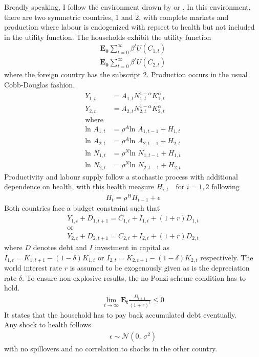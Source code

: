 \documentclass{article}
\begin{document}
Broadly speaking, I follow the environment drawn by \cite{backus1992international} or \cite{kim2003spurious}. In this environment, there are two symmetric countries, 1 and 2, with complete markets and production where labour is endogenized with repsect to health but not included in the utility function. The households exhibit the utility function
\begin{align}
\mathbf{E_0} \sum_{t=0}^{\infty} \beta^{t} U(C_{1, t}) \\
\mathbf{E_0} \sum_{t=0}^{\infty} \beta^{t} U(C_{2, t})
\end{align} 
where the foreign country has the subscript 2. Production occurs in the usual Cobb-Douglas fashion.
\begin{align}
Y_{1, t} &= A_{1, t} N_{1, t}^{1-\alpha} K_{1, t}^{\alpha} \\
Y_{2, t} &= A_{2, t} N_{2, t}^{1-\alpha} K_{2, t}^{\alpha} \\
\text{where} \nonumber \\
\text{ln } A_{1, t} &= \rho^A \text{ln } A_{1, t-1} + H_{1, t} \\
\text{ln } A_{2, t} &= \rho^A \text{ln } A_{2, t-1} + H_{2, t} \\
\text{ln } N_{1, t} &= \rho^N \text{ln } N_{1, t-1} + H_{1, t} \\
\text{ln } N_{2, t} &= \rho^N \text{ln } N_{2, t-1} + H_{2, t}
\end{align}
Productivity and labour supply follow a stochastic process with additional dependence on health, with this health measure $H_{i, t} \text{  } \text{ for }  i= 1,2$ following 
\begin{align}
H_t = \rho^H H_{t-1} + \epsilon
\end{align}
Both countries face a budget constraint such that 
\begin{align}
Y_{1, t} + D_{1, t+1} = C_{1, t} + I_{1, t} + (1+r)D_{1, t} \\
\text{or} \nonumber \\
Y_{2, t} + D_{2, t+1} = C_{2, t} + I_{2, t} + (1+r)D_{2, t}
\end{align}
where $D$ denotes debt and $I$ investment in capital as $I_{1, t} = K_{1, t+1} - (1 - \delta)K_{1, t}$ or $I_{2, t} = K_{2, t+1} - (1 - \delta)K_{2, t}$ respectively. The world interest rate $r$ is assumed to be exogenously given as is the depreciation rate $\delta$. To ensure non-explosive results, the no-Ponzi-scheme condition has to hold.
\begin{align}
\lim_{t \to \infty} \mathbf{E_t} \frac{D_{t+1}}{(1+r)^t} \leq 0
\end{align}
It states that the household has to pay back accumulated debt eventually. \\
Any shock to health follows 
\begin{align}
\epsilon \sim \mathcal{N}(0,\,\sigma^{2})
\end{align} 
with no spillovers and no correlation to shocks in the other country.
\end{document}
